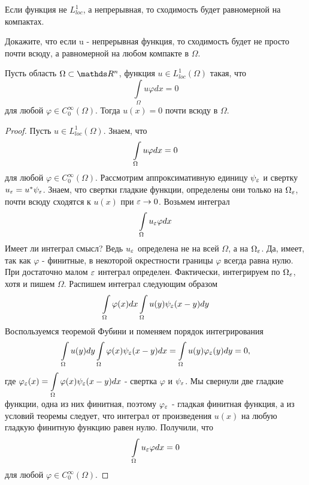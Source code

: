 Если функция не $L_{loc}^1$, а непрерывная, то сходимость будет равномерной на компактах.
\begin{exercise}
Докажите, что если u - непрерывная функция, то сходимость будет не просто почти всюду, а равномерной на любом компакте в $\Omega$.
\end{exercise}

\begin{lemma}
Пусть область $\Omega \subset \real^n$, функция $u \in L_{loc}^1(\Omega)$ такая, что 
$$\int \limits_{\Omega} u \varphi dx = 0$$ 
для любой $\varphi \in C_0^\infty(\Omega)$. Тогда $u(x) = 0$ почти всюду в $\Omega$.
\end{lemma}

\begin{proof}
Пусть $u \in L_{loc}^1(\Omega)$. Знаем, что
$$\int \limits_{\Omega} u \varphi dx = 0$$
для любой $\varphi \in C_0^{\infty}(\Omega)$.
Рассмотрим аппроксимативную единицу $\psi_{\varepsilon}$ и свертку $u_{\varepsilon} = u^* \psi_{\varepsilon}$. 
Знаем, что свертки гладкие функции, определены они только на $\Omega_{\varepsilon}$, почти всюду сходятся к $u(x)$ при $\varepsilon \rightarrow 0$. 
Возьмем интеграл 
$$\int \limits_{\Omega} u_{\varepsilon} \varphi dx$$
Имеет ли интеграл смысл? Ведь $u_{\varepsilon}$ определена не на всей $\Omega$, а на $\Omega_{\varepsilon}$. Да, имеет, так как $\varphi$ - финитные, в некоторой окрестности границы $\varphi$ всегда равна нулю. При достаточно малом $\varepsilon$ интеграл определен. Фактически, интегрируем по $\Omega_{\varepsilon}$, хотя и пишем $\Omega$. 
Распишем интеграл следующим образом
$$ \int \limits_{\Omega} \varphi(x) dx \int \limits_{\Omega} u(y) \psi_{\varepsilon}(x - y) dy$$
Воспользуемся теоремой Фубини и поменяем порядок интегрирования
$$ \int \limits_{\Omega} u(y) dy \int \limits_{\Omega} \varphi(x) \psi_{\varepsilon}(x - y) dx = \int \limits_{\Omega} u(y) \varphi_{\varepsilon}(y) dy = 0,$$
где $\varphi_{\varepsilon}(x) = \displaystyle \int \limits_{\Omega} \varphi(x) \psi_{\varepsilon}(x - y) dx$ - свертка $\varphi$ и $\psi_{\varepsilon}$. 
Мы свернули две гладкие функции, одна из них финитная, поэтому $\varphi_{\varepsilon}$ - гладкая финитная функция, а из условий теоремы следует, что интеграл от произведения $u(x)$ на любую гладкую финитную функцию равен нулю.
Получили, что 
$$\int \limits_{\Omega} u_{\varepsilon} \varphi dx = 0$$
для любой $\varphi \in C_0^{\infty}(\Omega)$.


\end{proof}
